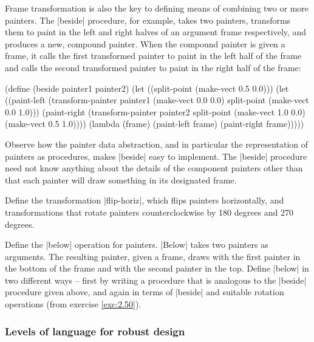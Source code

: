 \begin{Exercise}
\begin{Exercise}
\begin{Exercise}
\begin{Exercise}
\begin{Exercise}
\begin{Exercise}
\begin{Exercise}
\begin{Exercise}
\begin{Exercise}
Frame transformation is also the key to
defining means of combining two or more painters.
The \scheme|beside| procedure,
for example, takes two painters, transforms them
to paint in the left and right halves of an argument frame respectively,
and produces a new, compound painter.
When the compound painter is given a frame, it
calls the first transformed painter to paint in the left half of
the frame and calls the second transformed painter to paint in the
right half of the frame:
\begin{schemedisplay}
(define (beside painter1 painter2)
  (let ((split-point (make-vect 0.5 0.0)))
    (let ((paint-left
           (transform-painter painter1
                              (make-vect 0.0 0.0)
                              split-point
                              (make-vect 0.0 1.0)))
          (paint-right
           (transform-painter painter2
                              split-point
                              (make-vect 1.0 0.0)
                              (make-vect 0.5 1.0))))
      (lambda (frame)
        (paint-left frame)
        (paint-right frame)))))
\end{schemedisplay}

Observe how the painter data abstraction, and in particular the
representation of painters as procedures, makes \scheme|beside| easy to
implement.  The \scheme|beside| procedure need not know anything
about the details of the component painters other than that each
painter will draw something in its designated frame.

\begin{Exercise}
\label{exc:2.50}
Define the transformation \scheme|flip-horiz|, which flips
painters horizontally, and transformations that rotate
painters counterclockwise by 180 degrees and 270 degrees.



\begin{Exercise}
\label{exc:2.51}
Define the \scheme|below| operation for painters.  \scheme|Below| takes two
painters as arguments.  The resulting painter, given a frame,
draws with the first painter in the
bottom of the frame and with the second painter in the top.  Define \scheme|below| in two different ways -- first by writing a procedure that is
analogous to the \scheme|beside| procedure given above, and
again in terms of \scheme|beside| and suitable
rotation operations (from exercise \ref{exc:2.50}).




\subsubsection*{Levels of language for robust design}


\end{Exercise}
\end{Exercise}
\end{Exercise}
\end{Exercise}
\end{Exercise}
\end{Exercise}
\end{Exercise}
\end{Exercise}
\end{Exercise}
\end{Exercise}
\end{Exercise}
